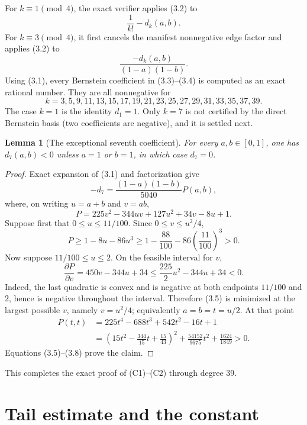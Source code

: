 \documentclass[11pt]{article}
\newtheorem{lemma}[theorem]{Lemma}
\begin{document}
For $k\equiv1\pmod4$, the exact verifier applies (3.2) to
\[
                       \frac1{k!}-d_k(a,b).              \tag{3.3}
\]
For $k\equiv3\pmod4$, it first cancels the manifest nonnegative edge factor
and applies (3.2) to
\[
                 \frac{-d_k(a,b)}{(1-a)(1-b)}.           \tag{3.4}
\]
Using (3.1), every Bernstein coefficient in (3.3)--(3.4) is computed as an
exact rational number.  They are all nonnegative for
\[
 k=3,5,9,11,13,15,17,19,21,23,25,27,29,31,33,35,37,39.
\]
The case $k=1$ is the identity $d_1=1$.  Only $k=7$ is not certified by the
direct Bernstein basis (two coefficients are negative), and it is settled
next.

\begin{lemma}[The exceptional seventh coefficient]
For every $a,b\in[0,1]$, one has $d_7(a,b)<0$ unless $a=1$ or $b=1$, in
which case $d_7=0$.
\end{lemma}

\begin{proof}
Exact expansion of (3.1) and factorization give
\[
 -d_7=\frac{(1-a)(1-b)}{5040}P(a,b),
\]
where, on writing $u=a+b$ and $v=ab$,
\[
 P=225v^2-344uv+127u^2+34v-8u+1.                       \tag{3.5}
\]
Suppose first that $0\leq u\leq11/100$.  Since $0\leq v\leq u^2/4$,
\[
 P\geq1-8u-86u^3\geq
 1-\frac{88}{100}-86\left(\frac{11}{100}\right)^3>0. \tag{3.6}
\]
Now suppose $11/100\leq u\leq2$.  On the feasible interval for $v$,
\[
 \frac{\partial P}{\partial v}=450v-344u+34
 \leq \frac{225}{2}u^2-344u+34<0.                      \tag{3.7}
\]
Indeed, the last quadratic is convex and is negative at both endpoints
$11/100$ and $2$, hence is negative throughout the interval.  Therefore
(3.5) is minimized at the largest possible $v$, namely $v=u^2/4$; equivalently
$a=b=t=u/2$.  At that point
\begin{align*}
 P(t,t)
 &=225t^4-688t^3+542t^2-16t+1\\
 &=\left(15t^2-\frac{344}{15}t+\frac{15}{43}\right)^2
   +\frac{54152}{9675}t^2+\frac{1624}{1849}>0.          \tag{3.8}
\end{align*}
Equations (3.5)--(3.8) prove the claim.
\end{proof}

This completes the exact proof of (C1)--(C2) through degree 39.

\section{Tail estimate and the constant}
\end{document}
